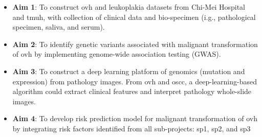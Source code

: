 \documentclass[12pt, a4paper]{article}
\newcommand{\aimone}{To construct \acrshort{ovh} and leukoplakia datasets from Chi-Mei Hospital and \acrfull{tmuh}}
\newcommand{\aimtwo}{To identify genetic variants associated with malignant transformation of \acrshort{ovh} by implementing genome-wide association testing (GWAS)}
\newcommand{\aimthree}{To construct a deep learning platform of genomics (mutation and expression) from pathology images}
\newcommand{\aimfour}{To develop risk prediction model for malignant transformation of \acrshort{ovh} by integrating risk factors identified from all sub-projects: sp1, sp2, and sp3}
\begin{document}
\begin{minipage}[t]{5.5in}
\vspace{0pt}
\begin{itemize}
        
\item \textbf{Aim 1}: \aimone, 
with collection of clinical data and bio-specimen (i.g., pathological specimen, saliva, and serum).


\item \textbf{Aim 2}: \aimtwo. 


\item \textbf{Aim 3}: \aimthree.
From \acrshort{ovh} and \acrshort{oscc}, a deep-learning-based algorithm could extract clinical features and interpret pathology whole-slide images.



\item \textbf{Aim 4}: 
\aimfour






\end{itemize}

\vspace{3em}
\end{minipage}
\end{document}
